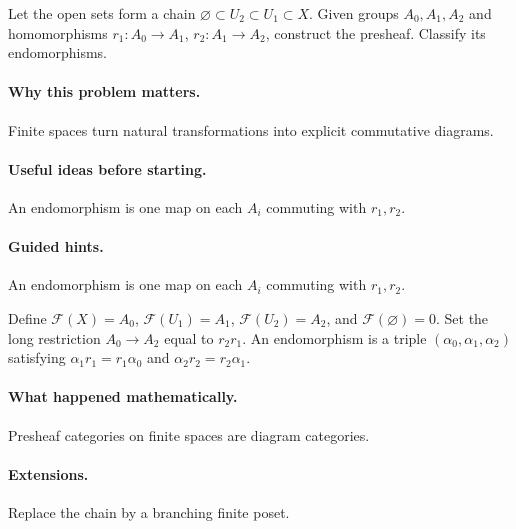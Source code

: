 \begin{problem}
Let the open sets form a chain $\varnothing\subset U_2\subset U_1\subset X$.  Given groups $A_0,A_1,A_2$ and homomorphisms $r_1:A_0\to A_1$, $r_2:A_1\to A_2$, construct the presheaf.  Classify its endomorphisms.
\end{problem}

\paragraph{Why this problem matters.}
Finite spaces turn natural transformations into explicit commutative diagrams.

\paragraph{Useful ideas before starting.}
An endomorphism is one map on each $A_i$ commuting with $r_1,r_2$.

\paragraph{Guided hints.}
An endomorphism is one map on each $A_i$ commuting with $r_1,r_2$.

\begin{solution}
Define $\mathcal F(X)=A_0$, $\mathcal F(U_1)=A_1$, $\mathcal F(U_2)=A_2$, and $\mathcal F(\varnothing)=0$.  Set the long restriction $A_0\to A_2$ equal to $r_2r_1$.  An endomorphism is a triple $(\alpha_0,\alpha_1,\alpha_2)$ satisfying $\alpha_1r_1=r_1\alpha_0$ and $\alpha_2r_2=r_2\alpha_1$.
\end{solution}

\paragraph{What happened mathematically.}
Presheaf categories on finite spaces are diagram categories.

\paragraph{Extensions.}
Replace the chain by a branching finite poset.
